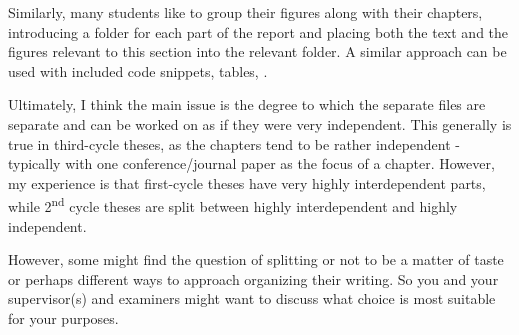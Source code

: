 \documentclass[examplethesis.tex]{subfiles}
\begin{document}
Similarly, many students like to group their figures along with their chapters, \ie introducing a folder for each part of the report and placing both the text and the figures relevant to this section into the relevant folder. A similar approach can be used with included code snippets, tables, \etc.

Ultimately, I think the main issue is the degree to which the separate files are separate and can be worked on as if they were very independent. This generally is true in third-cycle theses, as the chapters tend to be rather independent - typically with one conference/journal paper as the focus of a chapter. However, my experience is that first-cycle theses have very highly interdependent parts, while 2\textsuperscript{nd} cycle theses are split between highly interdependent and highly independent.

However, some might find the question of splitting or not to be a matter of taste or perhaps different ways to approach organizing their writing. So you and your supervisor(s) and examiners might want to discuss what choice is most suitable for your purposes.
\end{document}
